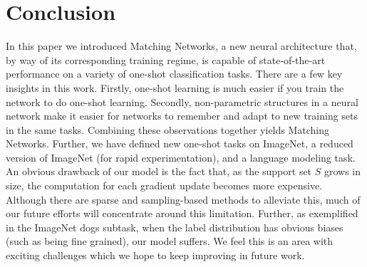 \vspace{-0.09in}
\section{Conclusion}

In this paper we introduced Matching Networks, a new neural architecture that, by way of its corresponding training regime, is capable of state-of-the-art performance on a variety of one-shot classification tasks.
There are a few key insights in this work.
Firstly, one-shot learning is much easier if you train the network to do one-shot learning.
Secondly, non-parametric structures in a neural network make it easier for networks to remember and adapt to new training sets in the same tasks.
Combining these observations together yields Matching Networks.
%
Further, we have defined new one-shot tasks on ImageNet, a reduced version of ImageNet (for rapid experimentation), and a language modeling task.
%
An obvious drawback of our model is the fact that, as the support set $S$ grows in size, the computation for each gradient update becomes more expensive. Although there are sparse and sampling-based methods to alleviate this, much of our future efforts will concentrate around this limitation. Further, as exemplified in the ImageNet dogs subtask, when the label distribution has obvious biases (such as being fine grained), our model suffers. We feel this is an area with exciting challenges which we hope to keep improving in future work.